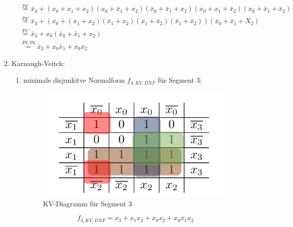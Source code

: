 \documentclass[a4paper]{article}
\begin{document}
\begin{enumerate}[label=\alph*)]
\begin{equation*}
\begin{aligned}
                           &\stackrel{P4'}{=} \bar{x}_3 + (x_0+x_1+x_2)(x_0+\bar{x}_1+x_2)(\bar{x}_0+\bar{x}_1+x_2)(x_0+x_1+\bar{x}_2)(x_0+\bar{x}_1+\bar{x}_2) \\
                           &\stackrel{P4'}{=} \bar{x}_3 + (x_0+(x_1+x_2)(\bar{x}_1+x_2)(x_1+\bar{x}_2)(\bar{x}_1+\bar{x}_2))(\bar{x}_0+\bar{x}_1+X_2) \\
                           &\stackrel{P5'}{=} \bar{x}_3 + x_0 (\bar{x}_0+\bar{x}_1+x_2) \\
                           &\stackrel{P9, P4}{=} \bar{x}_3+x_0\bar{x}_1 + x_0x_2
            \end{aligned}
	\end{equation*}
	
	\item Karnaugh-Veitch:
	\begin{enumerate}[label=\roman*)]
		\item minimale disjunkitve Normalform $f_{3, KV, DNF}$ für Segment 3:
		
		\begin{figure}[h]
			\begin{center}
				\includegraphics[scale=0.25]{KV-Segment-3.png}
			\end{center}
			\caption{KV-Diagramm für Segment 3}
		\end{figure}
	
		\begin{equation}
			f_{3, KV, DNF} = x_3 + x_1x_2 + x_0x_2 + \overline{x_0 x_1 x_2}
		\end{equation}
		

\end{enumerate}
\end{enumerate}
\end{document}
